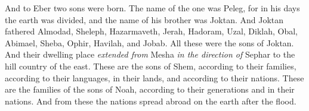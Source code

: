 \begin{biblechapter}
\verse And to Eber two sons were born. The name of the one was Peleg, for in his days the earth was divided, and the name of his brother was Joktan.
\verse And Joktan fathered Almodad, Sheleph, Hazarmaveth, Jerah,
\verse Hadoram, Uzal, Diklah,
\verse Obal, Abimael, Sheba,
\verse Ophir, Havilah, and Jobab. All these were the sons of Joktan.
\verse And their dwelling place \textit{extended from} Mesha \textit{in the direction of} Sephar to the hill country of the east.
\verse These are the sons of Shem, according to their families, according to their languages, in their lands, and according to their nations.
\verse These are the families of the sons of Noah, according to their generations and in their nations. And from these the nations spread abroad on the earth after the flood.
\end{biblechapter}

